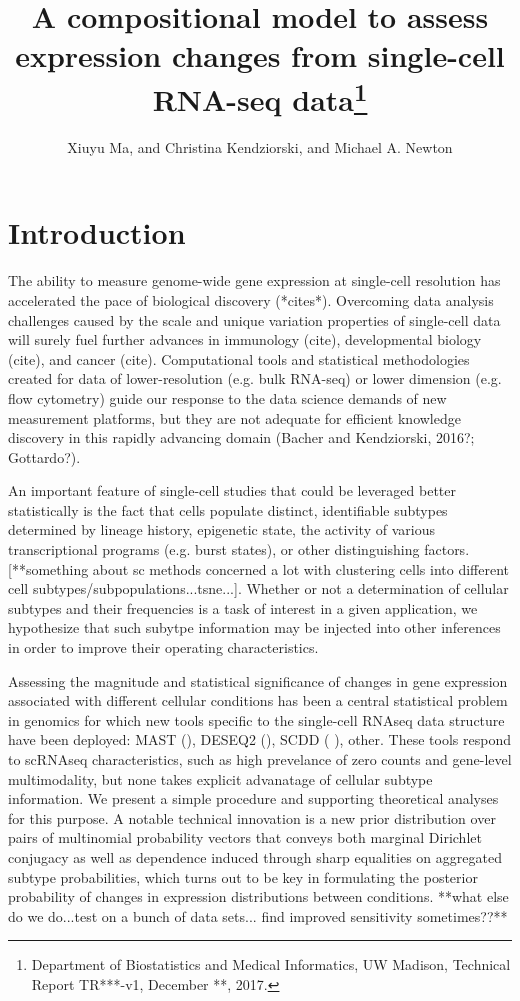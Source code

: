 \documentclass[11pt]{amsart}
\title{A compositional model to assess expression changes from
 single-cell RNA-seq data\footnote{Department of Biostatistics and Medical Informatics, UW Madison, Technical Report TR***-v1, December **, 2017.}}
\author{Xiuyu Ma,  and Christina Kendziorski, and Michael A. Newton}
\begin{document}
\maketitle
\section{Introduction}

The ability to measure genome-wide gene expression at single-cell resolution 
has accelerated the pace of biological discovery (*cites*).  Overcoming data
analysis challenges caused by the scale and unique variation properties of single-cell
data will surely fuel further advances in immunology (cite), developmental
biology (cite), and cancer (cite).  Computational tools and statistical methodologies 
created for data of lower-resolution (e.g. bulk RNA-seq) or lower dimension 
(e.g. flow cytometry)  guide our response to 
 the data science demands of new measurement platforms,
but they are not adequate for efficient knowledge discovery in this
rapidly advancing domain (Bacher and Kendziorski, 2016?; Gottardo?).

An important feature of single-cell studies that could be leveraged better
statistically is the fact that cells populate distinct, identifiable subtypes
determined by lineage history, epigenetic state, the activity
of various transcriptional programs (e.g. burst states), or other 
distinguishing factors. [**something about sc methods concerned a lot with
clustering cells into different cell subtypes/subpopulations...tsne...].
Whether or not a determination of cellular subtypes and their frequencies 
is a task of interest in a given application, we hypothesize that such
subytpe information may be injected into other inferences in order
 to improve their operating characteristics.

Assessing the magnitude and statistical significance of changes in gene
expression associated with different cellular conditions has been a central
statistical problem in genomics for which new tools specific to
the single-cell RNAseq data structure have been deployed: MAST (\cite{ref:MAST}),
DESEQ2 (\cite{ref:Des}), SCDD (\cite{ref:scDD} ), other.  These tools respond
to scRNAseq characteristics, such as high prevelance of zero counts and
gene-level multimodality, but none takes explicit advanatage of cellular subtype
information.  We present a simple procedure and supporting theoretical
analyses for this purpose.  A notable technical innovation is a new prior
distribution over pairs of multinomial probability vectors that conveys
both marginal Dirichlet conjugacy as well as
 dependence induced through sharp equalities on aggregated 
 subtype probabilities, which turns out to be key in formulating 
 the posterior probability of changes in expression distributions between conditions.
 **what else do we do...test on a bunch of data sets...
 find improved sensitivity sometimes??**
\end{document}
